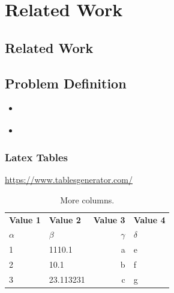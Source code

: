 \chapter{Related Work}\label{chapter:relatedwork}
\setlength{\parindent}{4em}
\setlength{\parskip}{1em}
\section{Related Work}
\lipsum[3-4]
\section{Problem Definition}
\begin{itemize}
\item \cite{Ref1}
\item \cite{Ref2}
\end{itemize}
\subsection{Latex Tables}
\href{Online Table}{https://www.tablesgenerator.com/}
\begin{table}[h!]
  \begin{center}
    \caption{More columns.}
    \label{tab:table1}
    \begin{tabular}{l|l|r|l}
      \textbf{Value 1} & \textbf{Value 2} & \textbf{Value 3} & \textbf{Value 4}\\ %
      $\alpha$ & $\beta$ & $\gamma$ & $\delta$ \\ %
      \hline
      1 & 1110.1 & a & e\\ %
      2 & 10.1 & b & f\\ %
      3 & 23.113231 & c & g\\ %
    \end{tabular}
  \end{center}
\end{table}
